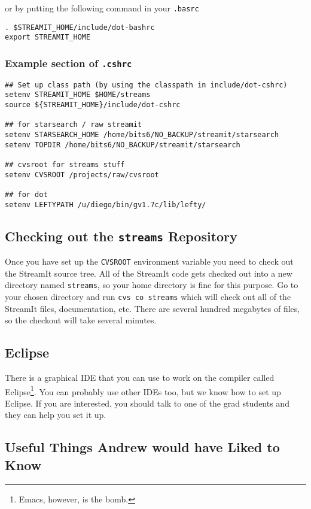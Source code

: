 or by putting the following command in your {\tt .basrc}

\begin{verbatim}
. $STREAMIT_HOME/include/dot-bashrc
export STREAMIT_HOME
\end{verbatim}

\subsubsection{Example section of {\tt .cshrc}}
\begin{verbatim}
## Set up class path (by using the classpath in include/dot-cshrc)
setenv STREAMIT_HOME $HOME/streams
source ${STREAMIT_HOME}/include/dot-cshrc

## for starsearch / raw streamit
setenv STARSEARCH_HOME /home/bits6/NO_BACKUP/streamit/starsearch
setenv TOPDIR /home/bits6/NO_BACKUP/streamit/starsearch

## cvsroot for streams stuff
setenv CVSROOT /projects/raw/cvsroot

## for dot
setenv LEFTYPATH /u/diego/bin/gv1.7c/lib/lefty/

\end{verbatim}



\subsection{Checking out the {\tt streams} Repository}
\label{sec:checkout}
Once you have set up the {\tt CVSROOT} environment variable
you need to check out the StreamIt source tree. All of the
StreamIt code gets checked out into a new directory named
{\tt streams}, so your home directory is fine for this purpose.
Go to your chosen directory and run {\tt cvs co streams} which
will check out all of the StreamIt files, documentation, etc.
There are several hundred megabytes of files, so the checkout 
will take several minutes.


\subsection{Eclipse}
There is a graphical IDE that you can use to work on the compiler called
Eclipse\footnote{Emacs, however, is the bomb.}. You can probably use other 
IDEs too, but we know how to set up
Eclipse. If you are interested, you should talk to one of the grad
students and they can help you set it up. 

\subsection{Useful Things Andrew would have Liked to Know}

